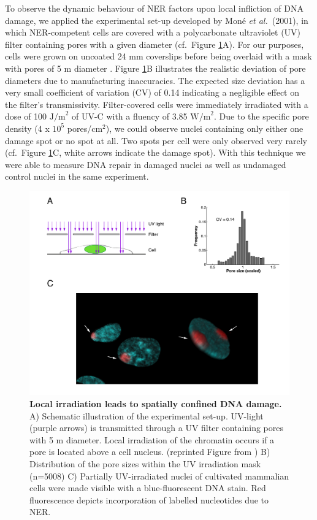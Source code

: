 To observe the dynamic behaviour of NER factors upon local infliction of DNA damage, we applied the experimental set-up developed by Mon\'e \textit{et al.}\ (2001)\cite{Mone2001}, in which NER-competent cells are covered with a polycarbonate ultraviolet (UV) filter containing pores with a given diameter (cf.\ Figure \ref{fig:accuMethod}A). For our purposes, cells were grown on uncoated 24 mm coverslips before being overlaid with a mask with pores of 5 \textmu m diameter \cite{Verbruggen2014}. Figure \ref{fig:accuMethod}B illustrates the realistic deviation of pore diameters due to manufacturing inaccuracies. The expected size deviation has a very small coefficient of variation (CV) of 0.14 indicating a negligible effect on the filter's transmissivity. Filter-covered cells were immediately irradiated with a dose of 100 $\text{J/m}^\text{2}$ of UV-C with a fluency of 3.85 $\text{W/m}^\text{2}$. Due to the specific pore density (4 x $\text{10}^\text{5}$ pores/$\text{cm}^\text{2}$), we could observe nuclei containing only either one damage spot or no spot at all. Two spots per cell were only observed very rarely (cf.\ Figure \ref{fig:accuMethod}C, white arrows indicate the damage spot). With this technique we were able to measure DNA repair in damaged nuclei as well as undamaged control nuclei in the same experiment.

\begin{figure}[t!]
	\begin{center}
		\includegraphics[width=1\textwidth]{Abbildungen/figure2_1.pdf}
		\caption{\textbf{Local irradiation leads to spatially confined DNA damage.} A) Schematic illustration of the experimental set-up. UV-light (purple arrows) is transmitted through a UV filter containing pores with 5 \textmu m diameter. Local irradiation of the chromatin occurs if a pore is located above a cell nucleus. (reprinted Figure from \cite{Terstiege2010}) B) Distribution of the pore sizes within the UV irradiation mask (n=5008) C) Partially UV-irradiated nuclei of cultivated mammalian cells were made visible with a blue-fluorescent DNA stain. Red fluorescence depicts incorporation of labelled nucleotides due to NER.}
		\label{fig:accuMethod}
	\end{center}
\end{figure}


